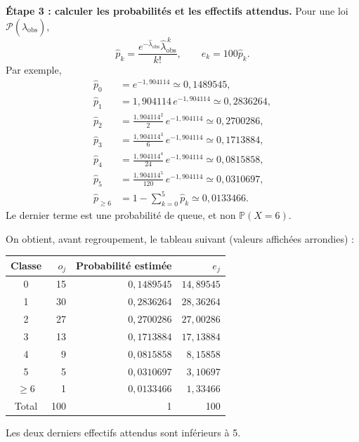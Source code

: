 {{\begin{minipage}{\linewidth}
\textbf{Étape 3 : calculer les probabilités et les effectifs attendus.}
Pour une loi $\mathcal P(\widehat\lambda_{\mathrm{obs}})$,
\[
\widehat p_k=\frac{e^{-\widehat\lambda_{\mathrm{obs}}}
\widehat\lambda_{\mathrm{obs}}^{\,k}}{k!},
\qquad e_k=100\widehat p_k.
\]
Par exemple,
\begin{align*}
\widehat p_0&=e^{-1{,}904114}\simeq0{,}1489545,\\
\widehat p_1&=1{,}904114\,e^{-1{,}904114}\simeq0{,}2836264,\\
\widehat p_2&=\frac{1{,}904114^2}{2}\,e^{-1{,}904114}\simeq0{,}2700286,\\
\widehat p_3&=\frac{1{,}904114^3}{6}\,e^{-1{,}904114}\simeq0{,}1713884,\\
\widehat p_4&=\frac{1{,}904114^4}{24}\,e^{-1{,}904114}\simeq0{,}0815858,\\
\widehat p_5&=\frac{1{,}904114^5}{120}\,e^{-1{,}904114}\simeq0{,}0310697,\\
\widehat p_{\geq6}&=1-\sum_{k=0}^5\widehat p_k\simeq0{,}0133466.
\end{align*}
Le dernier terme est une probabilité de queue, et non $\mathbb P(X=6)$.
\end{minipage}\par\smallskip
\begin{minipage}{\linewidth}
On obtient, avant regroupement, le tableau suivant (valeurs affichées arrondies) :
\begin{center}
\begin{tabular}{crrr}
\hline
Classe & $o_j$ & Probabilité estimée & $e_j$ \\ \hline
0 & 15 & $0{,}1489545$ & $14{,}89545$ \\
1 & 30 & $0{,}2836264$ & $28{,}36264$ \\
2 & 27 & $0{,}2700286$ & $27{,}00286$ \\
3 & 13 & $0{,}1713884$ & $17{,}13884$ \\
4 & 9 & $0{,}0815858$ & $8{,}15858$ \\
5 & 5 & $0{,}0310697$ & $3{,}10697$ \\
$\geq6$ & 1 & $0{,}0133466$ & $1{,}33466$ \\
Total & 100 & 1 & 100 \\ \hline
\end{tabular}
\end{center}
Les deux derniers effectifs attendus sont inférieurs à 5.
\end{minipage}\par\smallskip

}}
